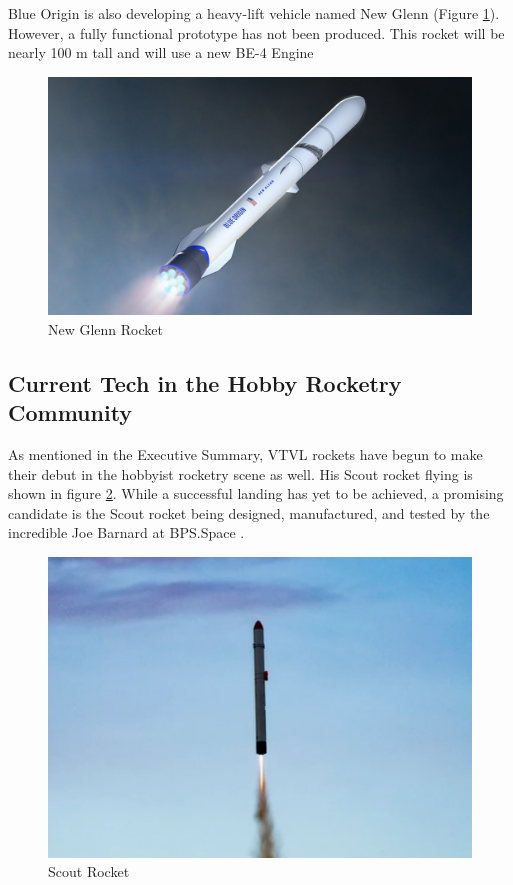 Blue Origin is also developing a heavy-lift vehicle named New Glenn (Figure \ref{fig:NGR}). However, a fully functional prototype has not been produced. This rocket will be nearly 100 m tall and will use a new BE-4 Engine

\begin{figure}[H]
    \centering
    \includegraphics[scale = 0.3]{src/figs/NewGlenn.jpg}
    \caption{New Glenn Rocket}
    \label{fig:NGR}
\end{figure}

\subsection{Current Tech in the Hobby Rocketry Community}

As mentioned in the Executive Summary, VTVL rockets have begun to make their debut in the hobbyist rocketry scene as well. His Scout rocket flying is shown in figure \ref{fig:SR}. While a successful landing has yet to be achieved, a promising candidate is the Scout rocket being designed, manufactured, and tested by the incredible Joe Barnard at BPS.Space \cite{bps-space-website}. 

\begin{figure}[H]
    \centering
    \includegraphics{src/figs/Scout_rocket.png}
    \caption{Scout Rocket}
    \label{fig:SR}
\end{figure}

